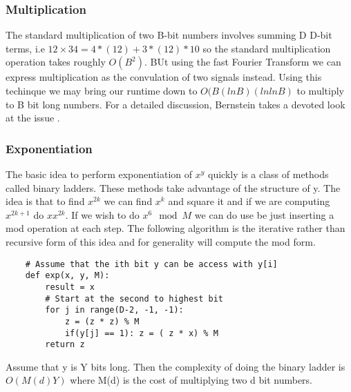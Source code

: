 \documentclass{article}
\begin{document}
\subsubsection{Multiplication}
The standard multiplication of two B-bit numbers involves summing D D-bit terms, i.e $12 \times 34 = 4*(12) + 3*(12) *10$ so the standard multiplication operation takes roughly $O(B^2)$.  BUt using the fast Fourier Transform we can express multiplication as the convulation of two signals instead. Using this techinque we may bring our runtime down to $O(B (ln B) ( ln ln B)$ to multiply to B bit long numbers. For a detailed discussion, Bernstein takes a devoted look at the issue \cite{bernstein}. 
\subsubsection{Exponentiation}
The basic idea to perform exponentiation of $x^y$ quickly is a class of methods called binary ladders. These methods take advantage of the structure of y. The idea is that to find $x^{2k}$ we can find $x^k$ and square it and if we are computing $x^{2k + 1}$ do $x x^{2k}$. If we wish to do $x^6 \mod M$ we can do use be just inserting a mod operation at each step.  The following algorithm is the iterative rather than recursive form of this idea and for generality will compute the mod form. 
\begin{verbatim}
    # Assume that the ith bit y can be access with y[i]
    def exp(x, y, M):
        result = x
        # Start at the second to highest bit
        for j in range(D-2, -1, -1):
            z = (z * z) % M
            if(y[j] == 1): z = ( z * x) % M
        return z
\end{verbatim}
Assume that y is Y bits long. Then the complexity of doing the binary ladder is $O(M(d)Y)$ where M(d) is the cost of multiplying two d bit numbers. 
\end{document}
